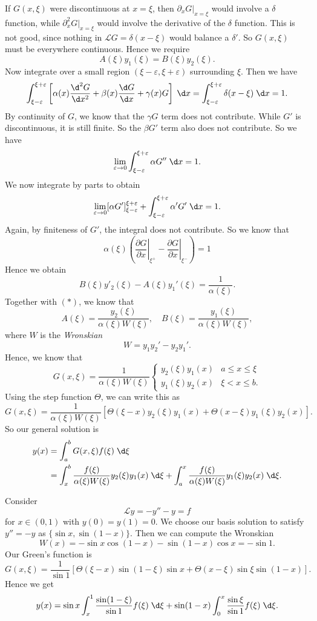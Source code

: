 \documentclass[a4paper]{article}
\begin{document}
If $G(x, \xi)$ were discontinuous at $x = \xi$, then $\partial_x G|_{x = \xi}$ would involve a $\delta$ function, while $\partial^2_x G|_{x = \xi}$ would involve the derivative of the $\delta$ function. This is not good, since nothing in $\mathcal{L}G = \delta(x - \xi)$ would balance a $\delta'$. So $G(x, \xi)$ must be everywhere continuous. Hence we require
\[
  A(\xi) y_1 (\xi) = B(\xi) y_2(\xi).\tag{$*$}
\]
Now integrate over a small region $(\xi - \varepsilon, \xi + \varepsilon)$ surrounding $\xi$. Then we have
\[
  \int_{\xi - \varepsilon}^{\xi + \varepsilon} \left[\alpha(x) \frac{\d^2 G}{\d x^2} + \beta(x) \frac{\d G}{\d x} + \gamma(x) G\right]\;\d x = \int_{\xi - \varepsilon}^{\xi + \varepsilon} \delta(x - \xi)\;\d x = 1.
\]
By continuity of $G$, we know that the $\gamma G$ term does not contribute. While $G'$ is discontinuous, it is still finite. So the $\beta G'$ term also does not contribute. So we have
\[
  \lim_{\varepsilon \to 0} \int_{\xi - \varepsilon}^{\xi + \varepsilon} \alpha G'' \;\d x = 1.
\]
We now integrate by parts to obtain
\[
  \lim_{\varepsilon \to 0} [\alpha G']^{\xi + \varepsilon}_{\xi - \varepsilon} + \int_{\xi - \varepsilon}^{\xi + \varepsilon} \alpha' G' \;\d x = 1.
\]
Again, by finiteness of $G'$, the integral does not contribute. So we know that
\[
  \alpha(\xi)\left(\left.\frac{\partial G}{\partial x}\right|_{\xi^+} - \left.\frac{\partial G}{\partial x}\right|_{\xi^-}\right) = 1
\]
Hence we obtain
\[
  B(\xi) y'_2 (\xi) - A(\xi) y_1'(\xi) = \frac{1}{\alpha(\xi)}.
\]
Together with $(*)$, we know that
\[
  A(\xi) = \frac{y_2(\xi)}{\alpha(\xi) W(\xi)},\quad B(\xi) = \frac{y_1(\xi)}{\alpha(\xi)W(\xi)},
\]
where $W$ is the \emph{Wronskian}
\[
  W = y_1 y_2' - y_2y_1'.
\]
Hence, we know that
\[
  G(x, \xi) = \frac{1}{\alpha(\xi)W(\xi)}
  \begin{cases}
    y_2(\xi) y_1(x) & a \leq x \leq \xi\\
    y_1(\xi) y_2(x) & \xi < x \leq b.
  \end{cases}
\]
Using the step function $\Theta$, we can write this as
\[
  G(x, \xi) = \frac{1}{\alpha(\xi)W(\xi)} [\Theta (\xi - x) y_2(\xi)y_1(x) + \Theta(x - \xi)y_1(\xi)y_2(x)].
\]
So our general solution is
\begin{align*}
  y(x) &= \int_a^b G(x, \xi) f(\xi)\;\d \xi\\
  &= \int_x^b \frac{f(\xi)}{\alpha(\xi)W(\xi)} y_2(\xi) y_1(x)\;\d \xi + \int_a^x \frac{f(\xi)}{\alpha(\xi)W(\xi)}y_1(\xi) y_2(x)\;\d \xi.
\end{align*}

\begin{eg}
  Consider
  \[
    \mathcal{L}y= -y'' - y = f
  \]
  for $x \in (0, 1)$ with $y(0) = y(1) = 0$. We choose our basis solution to satisfy $y'' = -y$ as $\{\sin x, \sin (1 - x)\}$. Then we can compute the Wronskian
  \[
    W(x) = -\sin x \cos(1 - x) - \sin (1 - x) \cos x = -\sin 1.
  \]
  Our Green's function is
  \[
    G(x, \xi) = \frac{1}{\sin 1}[\Theta(\xi - x) \sin (1 - \xi) \sin x + \Theta(x - \xi) \sin \xi \sin (1 - x)].
  \]
  Hence we get
  \[
    y(x) = \sin x \int_{x}^1 \frac{\sin (1 - \xi)}{ \sin 1}f(\xi) \;\d \xi + \sin(1 - x)\int_0^x \frac{\sin \xi}{\sin 1}f(\xi)\;\d \xi.
  \]
\end{eg}
\end{document}

